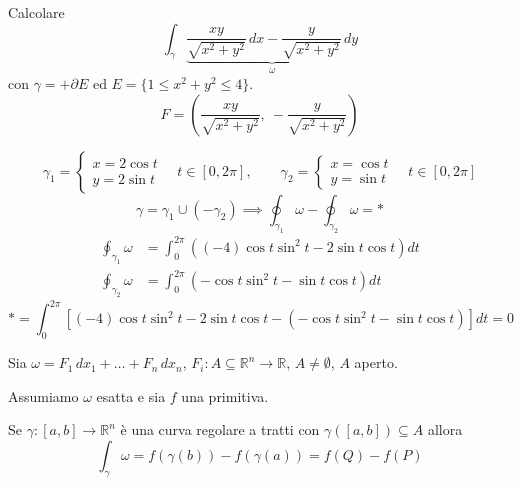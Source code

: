 \begin{esercizio}
Calcolare
\[
\int_\gamma \underbrace{\frac{xy}{\sqrt{x^2 + y^2}}\, dx - \frac{y}{\sqrt{x^2 + y^2}}\, dy}_{\omega}
\]
con $\gamma = +\partial E$ ed $E = \{ 1 \le x^2 + y^2 \le 4 \}$.
\[
F = \left( \frac{xy}{\sqrt{x^2 + y^2}}, \ -\frac{y}{\sqrt{x^2 + y^2}} \right)
\]
\begin{center}
\end{center}
\[
\gamma_1 = \begin{cases} x = 2 \cos t \\ y = 2 \sin t \end{cases} \quad t \in [0, 2\pi], \qquad \gamma_2 = \begin{cases} x = \cos t \\ y = \sin t \end{cases} \quad t \in [0, 2\pi]
\]
\[
\gamma = \gamma_1 \cup (-\gamma_2) \implies \oint_{\gamma_1} \omega - \oint_{\gamma_2} \omega = *
\]
\begin{align*}
\oint_{\gamma_1} \omega &= \int_0^{2\pi} \left( (-4) \cos t \sin^2 t - 2 \sin t \cos t \right) dt \\[4pt]
\oint_{\gamma_2} \omega &= \int_0^{2\pi} \left( -\cos t \sin^2 t - \sin t \cos t \right) dt
\end{align*}
\[
* = \int_0^{2\pi} \left[ (-4) \cos t \sin^2 t - 2 \sin t \cos t - \left( -\cos t \sin^2 t - \sin t \cos t \right) \right] dt = 0
\]
\end{esercizio}

\begin{theorem}
Sia $\omega = F_1\, dx_1 + \dots + F_n\, dx_n$, $F_i : A \subseteq \mathbb{R}^n \to \mathbb{R}$, $A \neq \emptyset$, $A$ aperto.

Assumiamo $\omega$ esatta e sia $f$ una primitiva.

Se $\gamma : [a, b] \to \mathbb{R}^n$ è una curva regolare a tratti con $\gamma([a, b]) \subseteq A$ allora
\[
\boxed{\int_\gamma \omega = f(\gamma(b)) - f(\gamma(a)) = f(Q) - f(P)}
\]
\end{theorem}

